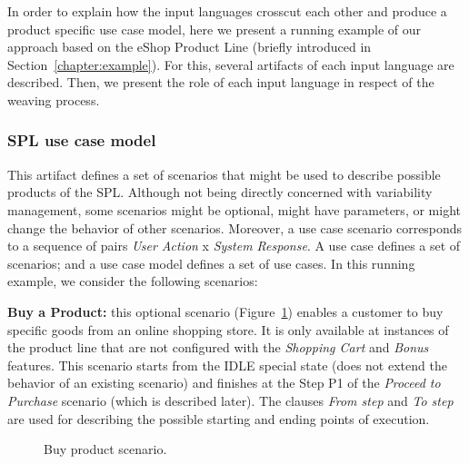\documentclass[11pt]{report}
\begin{document}
In order to explain how the input languages crosscut each other and produce a
product specific use case model, here we present a running example of our
approach based on the eShop Product Line (briefly introduced in
Section~\ref{chapter:example}). For this, several artifacts of each input language
are described. Then, we present the role of each input language in respect of the
weaving process.


\subsubsection{SPL use case model}\label{subsub:ucm}

This artifact defines a set of scenarios that might be used to describe possible
products of the SPL. Although not being directly concerned with variability
management, some scenarios might be optional, might have parameters, or might
change the behavior of other scenarios. Moreover, a use case scenario corresponds
to a sequence of pairs \emph{User Action} x \emph{System Response}.  A use case
defines a set of scenarios; and a use case model defines a set of use cases. In
this running example, we consider the following scenarios:

{\bf Buy a Product:} this optional scenario
(Figure~\ref{fig:buy-product-scenario}) enables a customer to buy specific goods
from an online shopping store. It is only available at instances of the product
line that are not configured with the \emph{Shopping Cart} and \emph{Bonus}
features. This scenario starts from the IDLE special state  (does not extend the
behavior of an existing scenario) and finishes at the Step P1 of the
\emph{Proceed to Purchase} scenario (which is described later). The clauses
\emph{From step} and \emph{To step} are used for describing the possible starting
and ending points of execution.

\begin{figure}[h]
 \caption{Buy product scenario.}
\label{fig:buy-product-scenario}
\end{figure}
\end{document}
